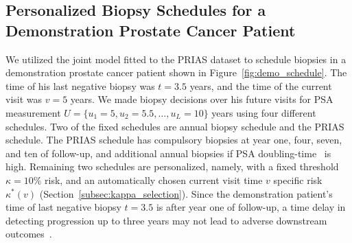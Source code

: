 \subsection{Personalized Biopsy Schedules for a Demonstration Prostate Cancer Patient}
\label{subsec:demo_patient}
We utilized the joint model fitted to the PRIAS dataset to schedule biopsies in a demonstration prostate cancer patient shown in Figure~\ref{fig:demo_schedule}. The time of his last negative biopsy was $t=3.5$ years, and the time of the current visit was $v=5$ years. We made biopsy decisions over his future visits for PSA measurement $U=\{u_1=5, u_2=5.5,\ldots,u_L=10\}$ years using four different schedules. Two of the fixed schedules are annual biopsy schedule and the PRIAS schedule. The PRIAS schedule has compulsory biopsies at year one, four, seven, and ten of follow-up, and additional annual biopsies if PSA doubling-time~\citep{bokhorst2015compliance} is high. Remaining two schedules are personalized, namely, with a fixed threshold $\kappa=10\%$ risk, and an automatically chosen current visit time $v$ specific risk $\kappa^*(v)$ (Section~\ref{subsec:kappa_selection}). Since the demonstration patient's time of last negative biopsy $t=3.5$ is after year one of follow-up, a time delay in detecting progression
up to three years may not lead to adverse downstream outcomes~\citep{carvalho}.


